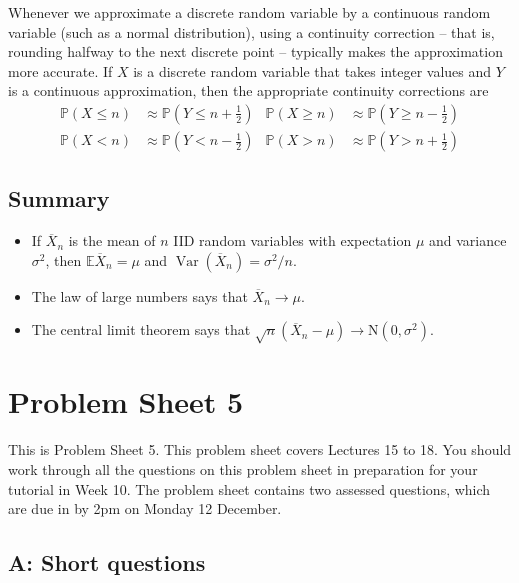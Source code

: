 \documentclass[
  a4paper,
]{book}
\providecommand{\tightlist}{%
  \setlength{\itemsep}{0pt}\setlength{\parskip}{0pt}}
\newif\ifcomm\commtrue
\theoremstyle{definition}
\theoremstyle{definition}
\theoremstyle{definition}
\theoremstyle{definition}
\theoremstyle{remark}
\begin{document}
Whenever we approximate a discrete random variable by a continuous random variable (such as a normal distribution), using a continuity correction -- that is, rounding halfway to the next discrete point -- typically makes the approximation more accurate. If \(X\) is a discrete random variable that takes integer values and \(Y\) is a continuous approximation, then the appropriate continuity corrections are
\begin{align*}
\mathbb P(X \leq n) &\approx \mathbb P(Y \leq n + \tfrac12) & \mathbb P(X \geq n) &\approx \mathbb P(Y \geq n - \tfrac12) \\
\mathbb P(X < n) &\approx \mathbb P(Y < n - \tfrac12) & \mathbb P(X > n) &\approx \mathbb P(Y > n + \tfrac12) 
\end{align*}

\hypertarget{summary-09}{%
\section*{Summary}\label{summary-09}}

\begin{itemize}
\tightlist
\item
  If \(\overline X_n\) is the mean of \(n\) IID random variables with expectation \(\mu\) and variance \(\sigma^2\), then \(\mathbb E\overline X_n = \mu\) and \(\operatorname{Var}(\overline X_n) = \sigma^2/n\).
\item
  The law of large numbers says that \(\overline X_n \to \mu\).
\item
  The central limit theorem says that \(\sqrt{n}(\overline X_n - \mu) \to \text{N}(0, \sigma^2)\).
\end{itemize}

\hypertarget{P5}{%
\chapter*{Problem Sheet 5}\label{P5}}

\commfalse

This is Problem Sheet 5. This problem sheet covers Lectures 15 to 18. You should work through all the questions on this problem sheet in preparation for your tutorial in Week 10. The problem sheet contains two assessed questions, which are due in by 2pm on Monday 12 December.

\hypertarget{P5-short}{%
\section*{A: Short questions}\label{P5-short}}
\end{document}
